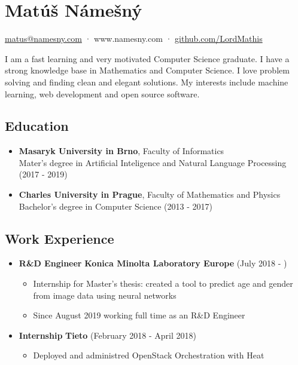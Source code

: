 \documentclass[a4,12pt]{article}
\begin{document}
\section*{Matúš Námešný}


\begin{center}
\href{mailto:matus@namesny.com}{matus@namesny.com} · www.namesny.com · \href{www.github.com/LordMathis}{github.com/LordMathis}
\end{center}

I am a fast learning and very motivated  Computer Science graduate. I have a strong knowledge base in Mathematics and Computer Science. I love problem solving and finding clean and elegant solutions. My interests include machine learning, web development and open source software.


\subsection*{Education}\label{education}

\begin{itemize}
\item
  \textbf{Masaryk University in Brno}, Faculty of Informatics\\
  Mater's degree in Artificial Inteligence and Natural Language Processing (2017 - 2019)
\item
  \textbf{Charles University in Prague}, Faculty of Mathematics and
  Physics\\
  Bachelor's degree in Computer Science (2013 - 2017)
\end{itemize}

\subsection*{Work Experience}\label{work}

\begin{itemize}
\item
  \textbf{R\&D Engineer} \hfill \textbf{Konica Minolta Laboratory Europe} \hfill (July 2018 - )
  \begin{itemize}
      \item Internship for Master's thesis: created a tool to predict age and gender from image data using neural networks
      \item Since August 2019 working full time as an R\&D Engineer
  \end{itemize}
\item
  \textbf{Internship} \hfill \textbf{Tieto} \hfill (February 2018 - April 2018)
  \begin{itemize}
      \item Deployed and administred OpenStack Orchestration with Heat
  \end{itemize}
\end{itemize}
\end{document}
